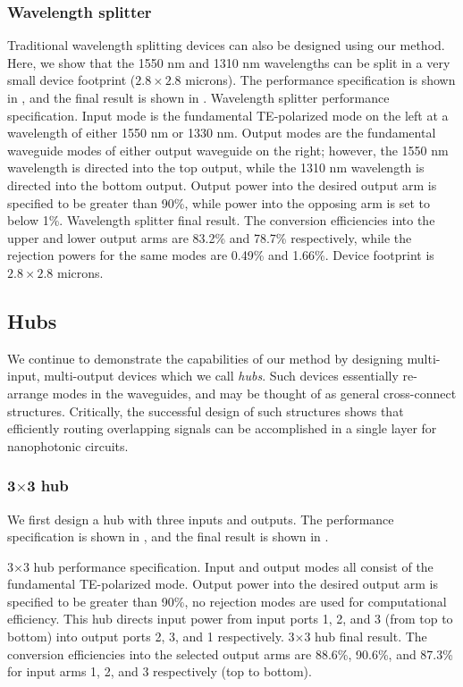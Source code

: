 \documentclass[letterpaper,10pt]{article}
\begin{document}
\subsubsection{Wavelength splitter}
Traditional wavelength splitting devices can also be designed using our method.
Here, we show that the 1550 nm and 1310 nm wavelengths can be split
    in a very small device footprint ($2.8\times2.8$ microns).
The performance specification is shown in , 
    and the final result is shown in .
    {Wavelength splitter performance specification.
    Input mode is the fundamental TE-polarized mode on the left at 
        a wavelength of either 1550 nm or 1330 nm.
    Output modes are the fundamental waveguide modes of either output 
        waveguide on the right;
        however, the 1550 nm wavelength is directed into the top output, 
        while the 1310 nm wavelength is directed into the bottom output.
    Output power into the desired output arm is specified to be greater than 90\%,
        while power into the opposing arm is set to below 1\%.}
    {Wavelength splitter final result.
    The conversion efficiencies into the upper and lower output arms
        are 83.2\% and 78.7\% respectively, 
        while the rejection powers for the same modes are 0.49\% and 1.66\%.
    Device footprint is $2.8\times2.8$ microns.}

\subsection{Hubs}
We continue to demonstrate the capabilities of our method
    by designing multi-input, multi-output devices which we call \emph{hubs}.
Such devices essentially re-arrange modes in the waveguides,
    and may be thought of as general cross-connect structures.
Critically, the successful design of such structures 
    shows that efficiently routing overlapping signals can be 
    accomplished in a single layer for nanophotonic circuits.

\subsubsection{3$\times$3 hub}
We first design a hub with three inputs and outputs.
The performance specification is shown in ,
    and the final result is shown in .

    {3$\times$3 hub performance specification.
    Input and output modes all consist of the fundamental TE-polarized mode.
    Output power into the desired output arm is specified to be greater than 90\%,
        no rejection modes are used for computational efficiency.
    This hub directs input power from input ports 1, 2, and 3 (from top to bottom)
    into output ports 2, 3, and 1 respectively.}
    {3$\times$3 hub final result.
    The conversion efficiencies into the selected output arms
        are 88.6\%, 90.6\%, and 87.3\% for 
        input arms 1, 2, and 3 respectively (top to bottom).}
\end{document}
